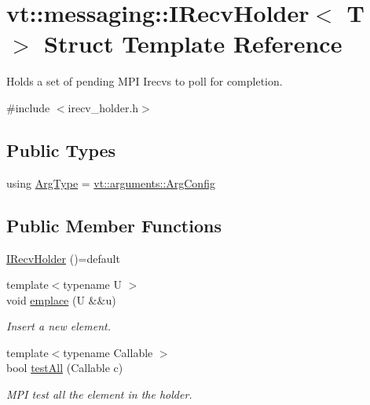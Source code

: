 \hypertarget{structvt_1_1messaging_1_1_i_recv_holder}{}\section{vt\+:\+:messaging\+:\+:I\+Recv\+Holder$<$ T $>$ Struct Template Reference}
\label{structvt_1_1messaging_1_1_i_recv_holder}


Holds a set of pending M\+PI Irecvs to poll for completion.  




{\ttfamily \#include $<$irecv\+\_\+holder.\+h$>$}

\subsection*{Public Types}
\begin{DoxyCompactItemize}
\item 
using \hyperlink{structvt_1_1messaging_1_1_i_recv_holder_aae9327cb1e82d6aee682457739dad4b5}{Arg\+Type} = \hyperlink{structvt_1_1arguments_1_1_arg_config}{vt\+::arguments\+::\+Arg\+Config}
\end{DoxyCompactItemize}
\subsection*{Public Member Functions}
\begin{DoxyCompactItemize}
\item 
\hyperlink{structvt_1_1messaging_1_1_i_recv_holder_a709a349d723247b10bf57ca2831bfe19}{I\+Recv\+Holder} ()=default
\item 
{\footnotesize template$<$typename U $>$ }\\void \hyperlink{structvt_1_1messaging_1_1_i_recv_holder_ab81d251a84cb2c8366eb5f5052ce002c}{emplace} (U \&\&u)
\begin{DoxyCompactList}\small\item\em Insert a new element. \end{DoxyCompactList}\item 
{\footnotesize template$<$typename Callable $>$ }\\bool \hyperlink{structvt_1_1messaging_1_1_i_recv_holder_a5c25ae9371ef928b00c42405d9d00a38}{test\+All} (Callable c)
\begin{DoxyCompactList}\small\item\em M\+PI test all the element in the holder. \end{DoxyCompactList}\end{DoxyCompactItemize}

